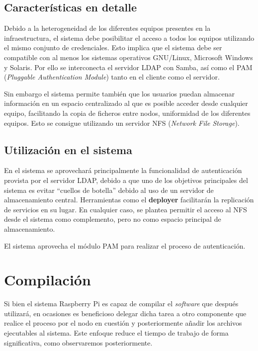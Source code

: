 \subsection{Características en detalle}

Debido a la heterogeneidad de los diferentes equipos presentes en la infraestructura, el sistema debe posibilitar el acceso a todos los equipos utilizando el mismo conjunto de credenciales. Esto implica que el sistema debe ser compatible con al menos los sistemas operativos GNU/Linux, Microsoft Windows y Solaris. Por ello se interconecta el servidor LDAP con Samba, así como el PAM (\textit{Pluggable Authentication Module}) tanto en el cliente como el servidor.

Sin embargo el sistema permite también que los usuarios puedan almacenar información en un espacio centralizado al que es posible acceder desde cualquier equipo, facilitando la copia de ficheros entre nodos, uniformidad de los diferentes equipos. Esto se consigue utilizando un servidor NFS (\textit{Network File Storage}).

\subsection{Utilización en el sistema}

En el sistema se aprovechará principalmente la funcionalidad de autenticación provista por el servidor LDAP, debido a que uno de los objetivos principales del sistema es evitar ``cuellos de botella'' debido al uso de un servidor de almacenamiento central. Herramientas como el \textbf{deployer} facilitarán la replicación de servicios en su lugar. En cualquier caso, se plantea permitir el acceso al NFS desde el sistema como complemento, pero no como espacio principal de almacenamiento.

El sistema aprovecha el módulo PAM para realizar el proceso de autenticación.

\section{Compilación}

Si bien el sistema Raspberry Pi es capaz de compilar el \textit{software} que después utilizará, en ocasiones es beneficioso delegar dicha tarea a otro componente que realice el proceso por el nodo en cuestión y posteriormente añadir los archivos ejecutables al sistema. Este enfoque reduce el tiempo de trabajo de forma significativa, como observaremos posteriormente.%


